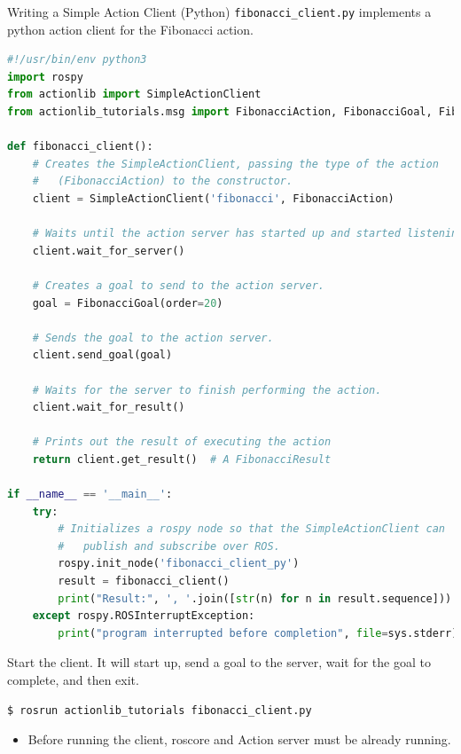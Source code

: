 \begin{frame}{Writing a Simple Action Client (Python)}
\texttt{fibonacci\_client.py} implements a python action client for the Fibonacci action.

\begin{lstlisting}[language=python]  
#!/usr/bin/env python3
import rospy
from actionlib import SimpleActionClient
from actionlib_tutorials.msg import FibonacciAction, FibonacciGoal, FibonacciResult

def fibonacci_client():
    # Creates the SimpleActionClient, passing the type of the action
    #   (FibonacciAction) to the constructor.
    client = SimpleActionClient('fibonacci', FibonacciAction)

    # Waits until the action server has started up and started listening for goals.
    client.wait_for_server()

    # Creates a goal to send to the action server.
    goal = FibonacciGoal(order=20)

    # Sends the goal to the action server.
    client.send_goal(goal)

    # Waits for the server to finish performing the action.
    client.wait_for_result()

    # Prints out the result of executing the action
    return client.get_result()  # A FibonacciResult

if __name__ == '__main__':
    try:
        # Initializes a rospy node so that the SimpleActionClient can
        #   publish and subscribe over ROS.
        rospy.init_node('fibonacci_client_py')
        result = fibonacci_client()
        print("Result:", ', '.join([str(n) for n in result.sequence]))
    except rospy.ROSInterruptException:
        print("program interrupted before completion", file=sys.stderr)
\end{lstlisting} 

\framebreak
Start the client. It will start up, send a goal to the server, wait for the goal to complete, and then exit.
\begin{lstlisting}[language=shell]  
$ rosrun actionlib_tutorials fibonacci_client.py
\end{lstlisting} 

\begin{itemize}
 \item Before running the client, roscore and Action server must be already running.
\end{itemize}
\end{frame}




